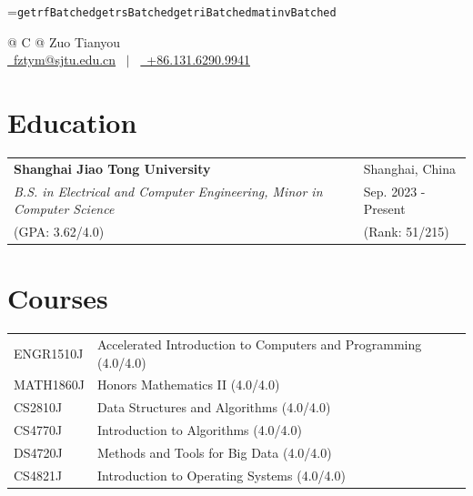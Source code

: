 \documentclass[a4paper,12pt]{article}
\begin{document}
=\hbox{\texttt{getrfBatched}\texttt{getrsBatched}\texttt{getriBatched}\texttt{matinvBatched}}

\pagestyle{empty} 


\begin{tabularx}{\linewidth}{@{} C @{}}
\Huge{Zuo Tianyou} \\[7.5pt]
\href{mailto:fztym@sjtu.edu.cn}{\raisebox{-0.05\height}\faEnvelope \ fztym@sjtu.edu.cn} \ $|$ \ 
\href{tel:+8613162909941}{\raisebox{-0.05\height}\faMobile \ +86.131.6290.9941} \\
\end{tabularx}


\section{Education}
\begin{tabularx}{\linewidth}{@{}l X@{}}	
\textbf{Shanghai Jiao Tong University} & Shanghai, China \\
\textit{B.S. in Electrical and Computer Engineering, Minor in Computer Science} & Sep. 2023 - Present \\  
\normalsize (GPA: 3.62/4.0) & (Rank: 51/215)\\
\end{tabularx}


\section{Courses}
\begin{tabularx}{\linewidth}{@{}l X@{}}	
ENGR1510J & Accelerated Introduction to Computers and Programming \hfill \normalsize (4.0/4.0)\\
MATH1860J & Honors Mathematics II \hfill \normalsize (4.0/4.0)\\
CS2810J & Data Structures and Algorithms  \hfill \normalsize (4.0/4.0)\\
CS4770J & Introduction to Algorithms \hfill \normalsize (4.0/4.0)\\
DS4720J & Methods and Tools for Big Data \hfill \normalsize (4.0/4.0)\\
CS4821J & Introduction to Operating Systems \hfill \normalsize (4.0/4.0)
\end{tabularx}
\end{document}
